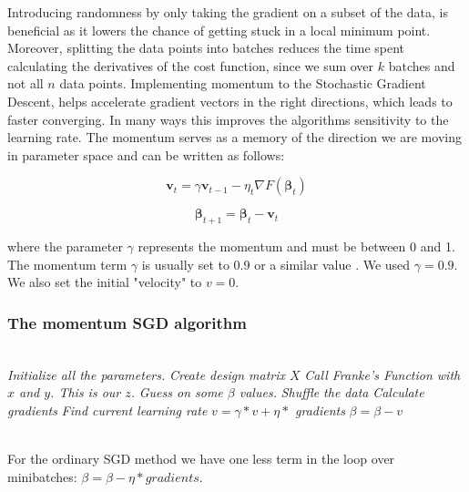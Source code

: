 \documentclass[a4paper, UKenglish, 11pt]{uiomaster}
\begin{document}
Introducing randomness by only taking the gradient on a subset of the data, is beneficial as it lowers the chance of getting stuck in a local minimum point. Moreover, splitting the data points into batches reduces the time spent calculating the derivatives of the cost function, since we sum over $k$ batches and not all $n$ data points.
Implementing momentum to the Stochastic Gradient Descent, helps accelerate gradient vectors in the right directions, which leads to faster converging. In many ways this improves the algorithms sensitivity to the learning rate. The momentum serves as a memory of the direction we are moving in parameter space and can be written as follows:

\begin{equation}
    \textbf{v}_{t} = \gamma\textbf{v}_{t-1} - \eta_t\nabla F(\boldsymbol{\beta}_t)
    \label{eq:GDM}
\end{equation}

\begin{equation}
    \boldsymbol{\beta}_{t+1} = \boldsymbol{\beta}_t - \textbf{v}_t
    \label{eq:GDM_beta}
\end{equation}

where the parameter $\gamma$ represents the momentum and must be between 0 and 1. The momentum term $\gamma$ is usually set to 0.9 or a similar value \cite{100}. We used $\gamma = 0.9$. We also set the initial "velocity" to $v=0$.

\subsubsection*{The momentum SGD algorithm}
\begin{algorithmic}[H]
\label{sudo:MSGD}
\\
\State \textit{Initialize all the parameters.}
\State \textit{Create design matrix $X$}
\State \textit{Call Franke's Function with $x$ and $y$. This is our $z$.}
\State \textit{Guess on some $\beta$ values.}
\State \textit{Shuffle the data}
\State \textit{Calculate gradients}
\State \textit{Find current learning rate}
\State \textit{$v = \gamma * v + \eta *$ gradients}
\State \textit{$\beta = \beta - v$}

\end{algorithmic}
\\
For the ordinary SGD method we have one less term in the loop over minibatches: \textit{$\beta = \beta - \eta * gradients$}.
\end{document}
